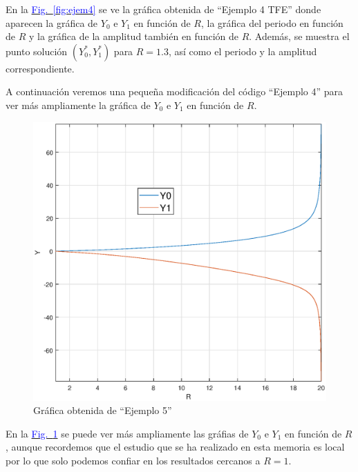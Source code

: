 \documentclass[12pt,a4paper]{report} %
\newcommand{\fref}[1]{\hyperref[#1]{\textcolor{blue}{Fig.~\ref*{#1}}}}
\begin{document}
	\vspace{0.5cm} En la \fref{fig:ejem4} se ve la gráfica obtenida de ``Ejemplo 4 TFE'' donde aparecen la gráfica de $Y_0$ e $Y_1$ en función de $R$, la gráfica del periodo en función de $R$ y la gráfica de la amplitud también en función de $R$. Además, se muestra el punto solución $(Y_0^*,Y_1^*)$ para $R=1.3$, así como el periodo y la amplitud correspondiente.
	
	\newpage
	
	\vspace{0.5cm} A continuación veremos una pequeña modificación del código ``Ejemplo 4'' para ver más ampliamente la gráfica de $Y_0$ e $Y_1$ en función de $R$.
	
	
	\vspace{1cm}
	
	\newpage
	
	\begin{figure}[h]
		\centering
		\includegraphics[width=1\textwidth]{ejem5nuevo.eps}
		\caption{Gráfica obtenida de ``Ejemplo 5''}
		\label{fig:ry1ry0}
	\end{figure}\smallskip
	
	\vspace{0.5cm}\noindent En la \fref{fig:ry1ry0} se puede ver más ampliamente las gráfias de $Y_0$ e $Y_1$ en función de $R$, aunque recordemos que el estudio que se ha realizado en esta memoria es local por lo que solo podemos confiar en los resultados cercanos a $R=1$.
	
\end{document}
